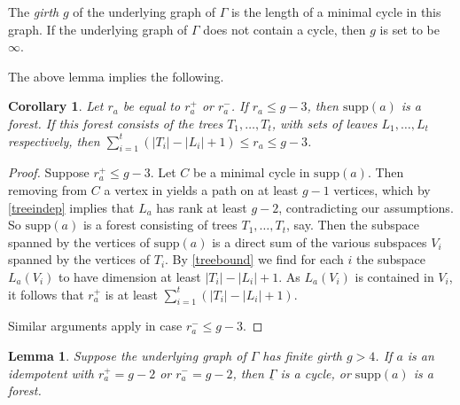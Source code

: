 \documentclass[oneside,a4paper]{amsart} %
\newtheorem{lemma}[proposition]{Lemma}
\newtheorem{corollary}[proposition]{Corollary}
\theoremstyle{definition}
\begin{document}
The \emph{girth} $g$ of the underlying graph of  $\Gamma$ is the length of a minimal cycle in this graph.
If the underlying graph of $\Gamma$ does not contain a cycle, then $g$ is set to be $\infty$.



The above lemma implies the following.



\begin{corollary}\label{tree}
Let $r_a$ be equal to $r^+_a$ or $r^-_a$. 
If $r_a\leq g-3$, then  $\mathrm{supp}(a)$ is a forest. 
If this forest consists of the trees $T_1,\dots, T_t$, with sets of leaves $L_1,\dots ,L_t$ respectively,
then $\displaystyle\sum_{i=1}^t (|T_i|-|L_i|+1)\leq r_a\leq g-3$.
\end{corollary}



\begin{proof}
Suppose $r_a^+\leq g-3$.
Let $C$ be a minimal cycle in  $\mathrm{supp}(a)$. Then removing from $C$ a vertex in  yields a path on at least $g-1$ vertices, 
which by \cref{treeindep} implies that $L_a$ has rank at least $g-2$, contradicting our assumptions.
So $\mathrm{supp}(a)$ is a forest 
consisting of trees $T_1, \dots, T_t$, say.
Then the subspace spanned by the vertices of $\mathrm{supp}(a)$ is a direct sum of the various subspaces $V_i$ spanned by the vertices of $T_i$. 
By \cref{treebound} we find  for each $i$ the subspace $L_a(V_i)$ to have  dimension at least $|T_i|-|L_i|+1$. As $L_a(V_i)$ is contained in $V_i$, 
it follows that $r^+_a$  is at least $\displaystyle\sum_{i=1}^t (|T_i|-|L_i|+1)$.

Similar arguments apply in case $r^-_a\leq g-3$.
\end{proof}


\begin{lemma}\label{specialtree}
Suppose the underlying graph of $\Gamma$ has finite girth $g>4$.
If $a$ is an idempotent with $r^+_a=g-2$ or $r^-_a=g-2$, then $\underline{\Gamma}$ is a cycle, 
or $\mathrm{supp}(a)$ is a forest.
\end{lemma}
\end{document}
